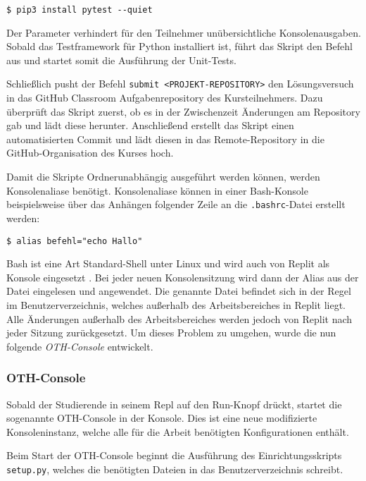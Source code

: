 \begin{lstlisting}[style=Bash]
$ pip3 install pytest --quiet
\end{lstlisting}

Der Parameter  verhindert für den Teilnehmer unübersichtliche
Konsolenausgaben. Sobald das Testframework für Python installiert ist, führt das
Skript den Befehl  aus und startet somit die Ausführung der
Unit-Tests.

Schließlich pusht der Befehl \texttt{submit <PROJEKT-REPOSITORY>}
den Lösungsversuch in das GitHub Classroom Aufgabenrepository des
Kursteilnehmers. Dazu überprüft das Skript zuerst, ob es in der Zwischenzeit
Änderungen am Repository gab und lädt diese herunter. Anschließend erstellt
das Skript einen automatisierten Commit und lädt diesen in das Remote-Repository
in die GitHub-Organisation des Kurses hoch.

Damit die Skripte Ordnerunabhängig ausgeführt werden können, werden
Konsolenaliase benötigt. Konsolenaliase können in einer Bash-Konsole
beispielsweise über das Anhängen folgender Zeile an die \texttt{.bashrc}-Datei
erstellt werden:

\begin{lstlisting}[style=Bash]
$ alias befehl="echo Hallo"
\end{lstlisting}

Bash ist eine Art \glqq Standard-Shell\grqq{} unter Linux und wird auch von
Replit als Konsole eingesetzt \parencite{bash}. Bei jeder neuen Konsolensitzung
wird dann der Alias aus der Datei eingelesen und angewendet. Die genannte Datei
befindet sich in der Regel im Benutzerverzeichnis, welches außerhalb des
Arbeitsbereiches in Replit liegt. Alle Änderungen außerhalb des Arbeitsbereiches
werden jedoch von Replit nach jeder Sitzung zurückgesetzt. Um dieses Problem zu
umgehen, wurde die nun folgende \emph{OTH-Console} entwickelt.

\subsubsection{OTH-Console}\label{replit-template-oth-console}
Sobald der Studierende in seinem Repl auf den Run-Knopf drückt, startet die
sogenannte OTH-Console in der Konsole. Dies ist eine neue
modifizierte Konsoleninstanz, welche alle für die Arbeit benötigten
Konfigurationen enthält.

Beim Start der OTH-Console beginnt die Ausführung des Einrichtungsskripts
\texttt{setup.py}, welches die benötigten Dateien in das Benutzerverzeichnis
schreibt.


